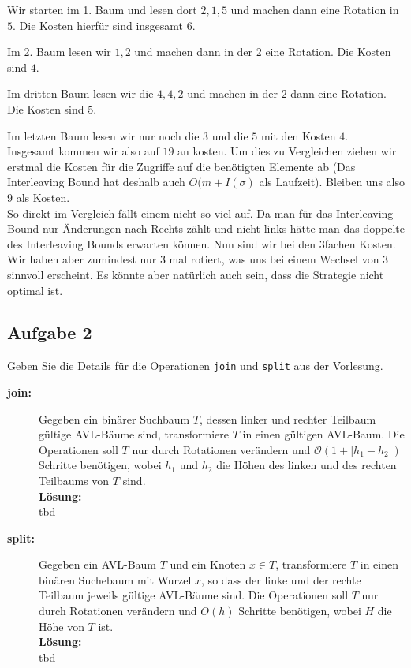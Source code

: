\documentclass[11pt,a4paper,ngerman]{article}
\begin{document}
Wir starten im 1. Baum und lesen dort $2,1,5$ und machen dann eine Rotation in $5$. Die Kosten hierfür sind insgesamt $6$.

Im 2. Baum lesen wir $1,2$ und machen dann in der 2 eine Rotation. Die Kosten sind $4$.

Im dritten Baum lesen wir die $4,4,2$ und machen in der $2$ dann eine Rotation. Die Kosten sind $5$.

Im letzten Baum lesen wir nur noch die $3$ und die $5$ mit den Kosten $4$.\\

Insgesamt kommen wir also auf $19$ an kosten. Um dies zu Vergleichen ziehen wir erstmal die Kosten für die Zugriffe auf
die benötigten Elemente ab (Das Interleaving Bound hat deshalb auch $O(m + I(\sigma)$ als Laufzeit). Bleiben uns also
$9$ als Kosten.\\

So direkt im Vergleich fällt einem nicht so viel auf. Da man für das Interleaving Bound nur Änderungen nach Rechts zählt und nicht links
hätte man das doppelte des Interleaving Bounds erwarten können. Nun sind wir bei den 3fachen Kosten. Wir haben aber zumindest nur 3 mal rotiert,
was uns bei einem Wechsel von $3$ sinnvoll erscheint. Es könnte aber natürlich auch sein, dass die Strategie nicht optimal ist.

\subsection*{Aufgabe 2}

Geben Sie die Details für die Operationen \lstinline|join| und \lstinline|split| aus der Vorlesung.

\begin{description}

\item[\bfseries join:] Gegeben ein binärer Suchbaum $T$, dessen linker und rechter Teilbaum gültige AVL-Bäume sind, transformiere $T$ in einen gültigen AVL-Baum. Die Operationen soll $T$ nur durch Rotationen verändern und $\mathcal{O}(1 + | h_1 - h_2|)$ Schritte benötigen, wobei $h_1$ und $h_2$ die Höhen des linken und des rechten Teilbaums von $T$ sind.\\

\noindent\textbf{Lösung:}\\

tbd

\item[\bfseries split:] Gegeben ein AVL-Baum $T$ und ein Knoten $x \in T$, transformiere $T$ in einen binären Suchebaum mit Wurzel $x$, so dass der linke und der rechte Teilbaum jeweils gültige AVL-Bäume sind. Die Operationen soll $T$ nur durch Rotationen verändern und $O(h)$ Schritte benötigen, wobei $H$ die Höhe von $T$ ist.\\

\noindent\textbf{Lösung:}\\

tbd

\end{description}

\label{LastPage}
\end{document}
